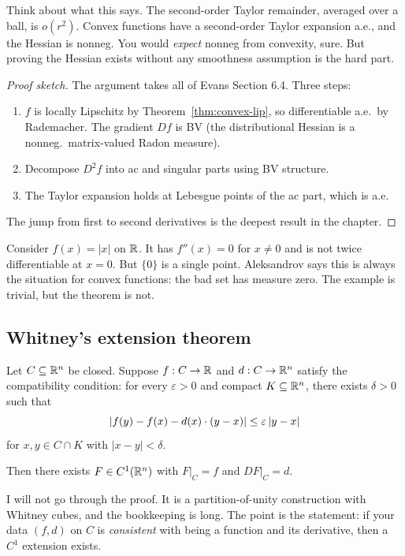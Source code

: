 Think about what this says. The second-order Taylor remainder, averaged over a ball, is $o(r^2)$. Convex functions have a second-order Taylor expansion a.e., and the Hessian is nonneg. You would \emph{expect} nonneg from convexity, sure. But proving the Hessian exists without any smoothness assumption is the hard part.

\begin{proof}[Proof sketch]
The argument takes all of Evans Section 6.4. Three steps:
\begin{enumerate}
    \item $f$ is locally Lipschitz by Theorem~\ref{thm:convex-lip}, so differentiable a.e.\ by Rademacher. The gradient $Df$ is BV (the distributional Hessian is a nonneg.\ matrix-valued Radon measure).
    \item Decompose $D^2 f$ into ac and singular parts using BV structure.
    \item The Taylor expansion holds at Lebesgue points of the ac part, which is a.e.
\end{enumerate}
The jump from first to second derivatives is the deepest result in the chapter.
\end{proof}

Consider $f(x) = |x|$ on $\mathbb{R}$. It has $f''(x) = 0$ for $x \neq 0$ and is not twice differentiable at $x = 0$. But $\{0\}$ is a single point. Aleksandrov says this is always the situation for convex functions: the bad set has measure zero. The example is trivial, but the theorem is not.

\subsection{Whitney's extension theorem}\label{subsec:whitney}

\begin{theorem}\label{thm:whitney}
Let $C \subseteq \mathbb{R}^n$ be closed. Suppose $f : C \to \mathbb{R}$ and $d : C \to \mathbb{R}^n$ satisfy the compatibility condition: for every $\varepsilon > 0$ and compact $K \subseteq \mathbb{R}^n$, there exists $\delta > 0$ such that
\[
    \left|f(y) - f(x) - d(x) \cdot (y - x)\right| \le \varepsilon \left|y - x\right|
\]
for $x, y \in C \cap K$ with $|x - y| < \delta$.

Then there exists $F \in C^1(\mathbb{R}^n)$ with $F|_C = f$ and $DF|_C = d$.
\end{theorem}

I will not go through the proof. It is a partition-of-unity construction with Whitney cubes, and the bookkeeping is long. The point is the statement: if your data $(f, d)$ on $C$ is \emph{consistent} with being a function and its derivative, then a $C^1$ extension exists.

